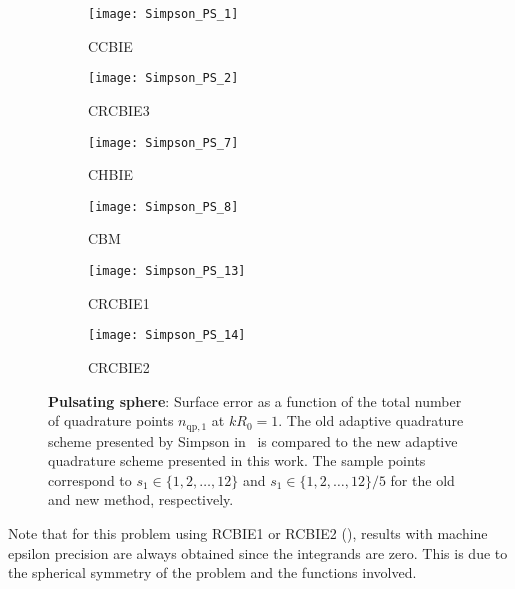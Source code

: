 \begin{figure}
	\begin{subfigure}{0.49\textwidth}
		\centering
		\texttt{[image: Simpson\_PS\_1]}
		\caption{CCBIE}
	\end{subfigure}%
	\hspace*{0.02\textwidth}%
	\begin{subfigure}{0.49\textwidth}
		\centering
		\texttt{[image: Simpson\_PS\_2]}
		\caption{CRCBIE3}
	\end{subfigure}
	\par\bigskip
	\par\bigskip
	\begin{subfigure}{0.49\textwidth}
		\centering
		\texttt{[image: Simpson\_PS\_7]}
		\caption{CHBIE}
	\end{subfigure}%
	\hspace*{0.02\textwidth}%
	\begin{subfigure}{0.49\textwidth}
		\centering
		\texttt{[image: Simpson\_PS\_8]}
		\caption{CBM}
	\end{subfigure}
	\par\bigskip
	\par\bigskip
	\begin{subfigure}{0.49\textwidth}
		\centering
		\texttt{[image: Simpson\_PS\_13]}
		\caption{CRCBIE1}
	\end{subfigure}%
	\hspace*{0.02\textwidth}%
	\begin{subfigure}{0.49\textwidth}
		\centering
		\texttt{[image: Simpson\_PS\_14]}
		\caption{CRCBIE2}
	\end{subfigure}
	\caption{\textbf{Pulsating sphere}: Surface error as a function of the total number of quadrature points $n_{\mathrm{qp,1}}$ at $kR_0=1$.  The old adaptive quadrature scheme presented by Simpson in~\cite{Simpson2014aib} is compared to the new adaptive quadrature scheme presented in this work. The sample points correspond to $s_1\in\{1,2,\dots,12\}$ and $s_1\in\{1,2,\dots,12\}/5$ for the old and new method, respectively.}
	\label{Fig3:Simpson_PS_1}
\end{figure}
Note that for this problem using RCBIE1 or RCBIE2 (), results with machine epsilon precision are always obtained since the integrands are zero. This is due to the spherical symmetry of the problem and the functions involved.

